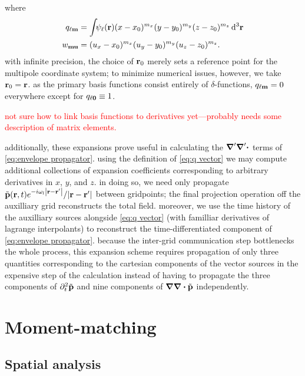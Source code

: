 where
\begin{subequations}
  \begin{align}
    q_{\ell \vb{m}} &= \int_{} \psi_\ell(\vb{r}) (x - x_0)^{m_x} (y - y_0)^{m_y} (z - z_0)^{m_z} \dd[3]{\vb{r}} \label{eq:q vector}\\
    w_{\vb{m}\vb{u}} &= (u_x - x_0)^{m_x} (u_y - y_0)^{m_y} (u_z - z_0)^{m_z} \label{eq:w matrix}.
  \end{align}
\end{subequations}
with infinite precision, the choice of $\vb{r}_0$ merely sets a reference point for the multipole coordinate system; to minimize numerical issues, however, we take $\vb{r}_0 = \vb{r}$.
as the primary basis functions consist entirely of $\delta$-functions, $q_{\ell\vb{m}} = 0$ everywhere except for $q_{\ell \vb{0}} \equiv 1$.

\textcolor{red}{not sure how to link basis functions to derivatives yet---probably needs some description of matrix elements.}

additionally, these expansions prove useful in calculating the $\grad' \grad' \boldsymbol{\cdot}$ terms of \cref{eq:envelope propagator}.
using the definition of \cref{eq:q vector} we may compute additional collections of expansion coefficients corresponding to arbitrary derivatives in $x$, $y$, and $z$.
in doing so, we need only propagate $\tilde{\vb{p}}(\vb{r}, t)e^{-i \omega_l \abs{\vb{r} - \vb{r}'}}/\abs{\vb{r} - \vb{r}'}$ between gridpoints; the final projection operation off the auxilliary grid reconstructs the total field.
moreover, we use the time history of the auxilliary sources alongside \cref{eq:q vector} (with familliar derivatives of lagrange interpolants) to reconstruct the time-differentiated component of \cref{eq:envelope propagator}.
because the inter-grid communication step bottlenecks the whole process, this expansion scheme requires propagation of only three quantities corresponding to the cartesian components of the vector sources in the expensive step of the calculation instead of having to propagate the three components of $\partial_t^2 \tilde{\vb{p}}$ and nine components of $\grad \grad \boldsymbol{\cdot} \tilde{\vb{p}}$ independently.

\section{Moment-matching}

\subsection{Spatial analysis}

